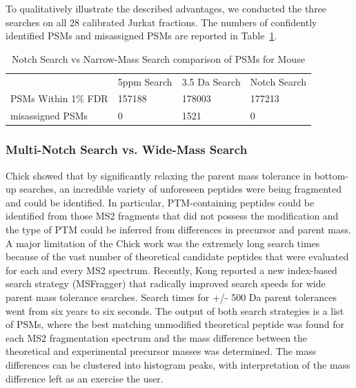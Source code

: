 \documentclass[journal=jprobs,manuscript=article]{achemso}
\begin{document}
To qualitatively illustrate the described advantages, we conducted the three searches on all 28 calibrated Jurkat fractions.
The numbers of confidently identified PSMs and misassigned PSMs are reported in Table~\ref{tbl:singleVsMultiNotch}.

\begin{table}[]
\centering
\caption{Notch Search vs Narrow-Mass Search comparison of PSMs for Mouse}
\label{tbl:singleVsMultiNotch}
\begin{tabular}{llll}
                    & 5ppm Search & 3.5 Da Search & Notch Search \\
PSMs Within 1\% FDR & 157188      & 178003        & 177213       \\
misassigned PSMs    & 0           & 1521          & 0            \\
\end{tabular}
\end{table}

\subsubsection{Multi-Notch Search vs. Wide-Mass Search}

Chick\citep{Chick_2015} showed that by significantly relaxing the parent mass tolerance in bottom-up searches, an incredible variety of unforeseen peptides were being fragmented and could be identified.
In particular, PTM-containing peptides could be identified from those MS2 fragments that did not possess the modification and the type of PTM could be inferred from differences in precursor and parent mass.
A major limitation of the Chick work was the extremely long search times because of the vast number of theoretical candidate peptides that were evaluated for each and every MS2 spectrum.
Recently, Kong\citep{Kong_2017} reported a new index-based search strategy (MSFragger) that radically improved search speeds for wide parent mass tolerance searches.
Search times for +/- 500 Da parent tolerances went from six years to six seconds.
The output of both search strategies is a list of PSMs, where the best matching unmodified theoretical peptide was found for each MS2 fragmentation spectrum and the mass difference between the theoretical and experimental precursor masses was determined.
The mass differences can be clustered into histogram peaks\citep{Rodriguez_2014}, with interpretation of the mass difference left as an exercise the user.
\end{document}
